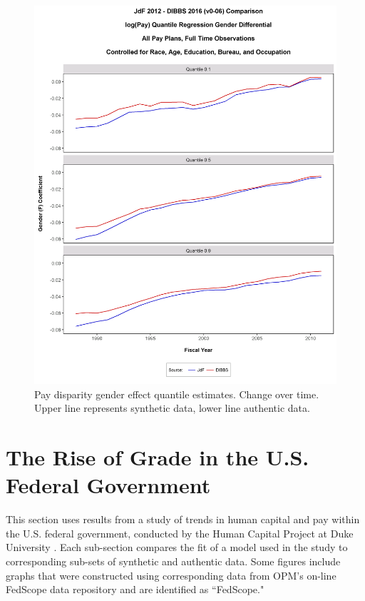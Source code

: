\documentclass[10pt, letterpaper]{article}
\begin{document}
\begin{spacing}{1.0}
\begin{figure}[h]
    \centering
    \includegraphics[width=5.25in, trim={0 0.75in 0 1.5in}, clip]{GenderPayDifferentialQuantileRegressionAgeRaceEdPanelv0-06.png}
    \caption{Pay disparity gender effect quantile estimates.  Change over time.  Upper line represents synthetic data, lower line authentic data.}
    \label{figure:GenderPayDifferentialQuantileRegressionAgeRaceEdPanelv0-06}
\end{figure}

\clearpage

\section{The Rise of Grade in the U.S. Federal Government}

This section uses results from a study of trends in human capital and pay within the U.S. federal government, conducted by the Human Capital Project at Duke University \citep{BoltondeFigGradeInflation2016}.  Each sub-section compares the fit of a model used in the study to corresponding sub-sets of synthetic and authentic data.  Some figures include graphs that were constructed using corresponding data from OPM's on-line FedScope data repository  \citep{OPMFedScope} and are identified as ``FedScope."


\end{spacing}
\end{document}
